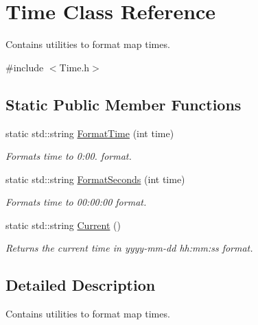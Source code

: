 \hypertarget{classTime}{\section{Time Class Reference}
\label{classTime}
}


Contains utilities to format map times.  




{\ttfamily \#include $<$Time.\-h$>$}

\subsection*{Static Public Member Functions}
\begin{DoxyCompactItemize}
\item 
static std\-::string \hyperlink{classTime_a12af49ccb2dcc55223aa84c1113839c9}{Format\-Time} (int time)
\begin{DoxyCompactList}\small\item\em Formats time to 0\-:00. format. \end{DoxyCompactList}\item 
static std\-::string \hyperlink{classTime_acaa0e15e5a3a5ec41a51f01c505fd628}{Format\-Seconds} (int time)
\begin{DoxyCompactList}\small\item\em Formats time to 00\-:00\-:00 format. \end{DoxyCompactList}\item 
\hypertarget{classTime_a77ceda2324c0e82bf2177634b8e9c812}{static std\-::string \hyperlink{classTime_a77ceda2324c0e82bf2177634b8e9c812}{Current} ()}\label{classTime_a77ceda2324c0e82bf2177634b8e9c812}

\begin{DoxyCompactList}\small\item\em Returns the current time in yyyy-\/mm-\/dd hh\-:mm\-:ss format. \end{DoxyCompactList}\end{DoxyCompactItemize}


\subsection{Detailed Description}
Contains utilities to format map times. 


